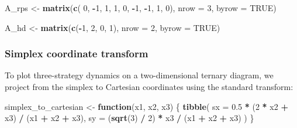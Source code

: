 \documentclass[
]{article}
\newenvironment{Shaded}{\begin{snugshade}}{\end{snugshade}}
\newcommand{\AttributeTok}[1]{\textcolor[rgb]{0.13,0.29,0.53}{#1}}
\newcommand{\ConstantTok}[1]{\textcolor[rgb]{0.56,0.35,0.01}{#1}}
\newcommand{\ControlFlowTok}[1]{\textcolor[rgb]{0.13,0.29,0.53}{\textbf{#1}}}
\newcommand{\DecValTok}[1]{\textcolor[rgb]{0.00,0.00,0.81}{#1}}
\newcommand{\FloatTok}[1]{\textcolor[rgb]{0.00,0.00,0.81}{#1}}
\newcommand{\FunctionTok}[1]{\textcolor[rgb]{0.13,0.29,0.53}{\textbf{#1}}}
\newcommand{\NormalTok}[1]{#1}
\newcommand{\OtherTok}[1]{\textcolor[rgb]{0.56,0.35,0.01}{#1}}
\newcommand{\SpecialCharTok}[1]{\textcolor[rgb]{0.81,0.36,0.00}{\textbf{#1}}}
\begin{document}
\begin{Shaded}
\begin{Highlighting}[]
\NormalTok{A\_rps }\OtherTok{\textless{}{-}} \FunctionTok{matrix}\NormalTok{(}\FunctionTok{c}\NormalTok{( }\DecValTok{0}\NormalTok{, }\SpecialCharTok{{-}}\DecValTok{1}\NormalTok{,  }\DecValTok{1}\NormalTok{,}
                    \DecValTok{1}\NormalTok{,  }\DecValTok{0}\NormalTok{, }\SpecialCharTok{{-}}\DecValTok{1}\NormalTok{,}
                   \SpecialCharTok{{-}}\DecValTok{1}\NormalTok{,  }\DecValTok{1}\NormalTok{,  }\DecValTok{0}\NormalTok{), }\AttributeTok{nrow =} \DecValTok{3}\NormalTok{, }\AttributeTok{byrow =} \ConstantTok{TRUE}\NormalTok{)}

\NormalTok{A\_hd }\OtherTok{\textless{}{-}} \FunctionTok{matrix}\NormalTok{(}\FunctionTok{c}\NormalTok{(}\SpecialCharTok{{-}}\DecValTok{1}\NormalTok{, }\DecValTok{2}\NormalTok{,}
                   \DecValTok{0}\NormalTok{, }\DecValTok{1}\NormalTok{), }\AttributeTok{nrow =} \DecValTok{2}\NormalTok{, }\AttributeTok{byrow =} \ConstantTok{TRUE}\NormalTok{)}
\end{Highlighting}
\end{Shaded}

\subsubsection{Simplex coordinate
transform}\label{simplex-coordinate-transform}

To plot three-strategy dynamics on a two-dimensional ternary diagram, we
project from the simplex to Cartesian coordinates using the standard
transform:

\begin{Shaded}
\begin{Highlighting}[]
\NormalTok{simplex\_to\_cartesian }\OtherTok{\textless{}{-}} \ControlFlowTok{function}\NormalTok{(x1, x2, x3) \{}
  \FunctionTok{tibble}\NormalTok{(}
    \AttributeTok{sx =} \FloatTok{0.5} \SpecialCharTok{*}\NormalTok{ (}\DecValTok{2} \SpecialCharTok{*}\NormalTok{ x2 }\SpecialCharTok{+}\NormalTok{ x3) }\SpecialCharTok{/}\NormalTok{ (x1 }\SpecialCharTok{+}\NormalTok{ x2 }\SpecialCharTok{+}\NormalTok{ x3),}
    \AttributeTok{sy =}\NormalTok{ (}\FunctionTok{sqrt}\NormalTok{(}\DecValTok{3}\NormalTok{) }\SpecialCharTok{/} \DecValTok{2}\NormalTok{) }\SpecialCharTok{*}\NormalTok{ x3 }\SpecialCharTok{/}\NormalTok{ (x1 }\SpecialCharTok{+}\NormalTok{ x2 }\SpecialCharTok{+}\NormalTok{ x3)}
\NormalTok{  )}
\NormalTok{\}}
\end{Highlighting}
\end{Shaded}
\end{document}
